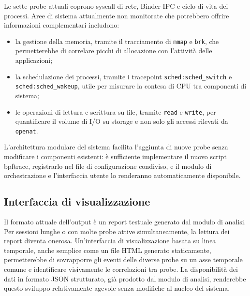 Le sette probe attuali coprono syscall di rete, Binder IPC e ciclo di vita dei processi. Aree di sistema attualmente non monitorate che potrebbero offrire informazioni complementari includono:

\begin{itemize}
    \item la gestione della memoria, tramite il tracciamento di \texttt{mmap} e \texttt{brk}, che permetterebbe di correlare picchi di allocazione con l'attività delle applicazioni;
    \item la schedulazione dei processi, tramite i tracepoint \texttt{sched:sched\_switch} e \texttt{sched:sched\_wakeup}, utile per misurare la contesa di CPU tra componenti di sistema;
    \item le operazioni di lettura e scrittura su file, tramite \texttt{read} e \texttt{write}, per quantificare il volume di I/O su storage e non solo gli accessi rilevati da \texttt{openat}.
\end{itemize}

L'architettura modulare del sistema facilita l'aggiunta di nuove probe senza modificare i componenti esistenti: è sufficiente implementare il nuovo script bpftrace, registrarlo nel file di configurazione condiviso, e il modulo di orchestrazione e l'interfaccia utente lo renderanno automaticamente disponibile.

\subsection{Interfaccia di visualizzazione}

Il formato attuale dell'output è un report testuale generato dal modulo di analisi. Per sessioni lunghe o con molte probe attive simultaneamente, la lettura dei report diventa onerosa. Un'interfaccia di visualizzazione basata su linea temporale, anche semplice come un file HTML generato staticamente, permetterebbe di sovrapporre gli eventi delle diverse probe su un asse temporale comune e identificare visivamente le correlazioni tra probe. La disponibilità dei dati in formato JSON strutturato, già prodotto dal modulo di analisi, renderebbe questo sviluppo relativamente agevole senza modifiche al nucleo del sistema.
